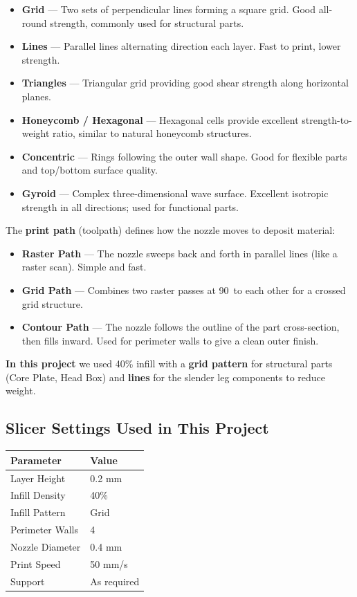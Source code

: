 \documentclass[12pt, a4paper]{article}
\begin{document}
\begin{itemize}[itemsep=3pt]
  \item \textbf{Grid} --- Two sets of perpendicular lines forming a square
  grid. Good all-round strength, commonly used for structural parts.
  \item \textbf{Lines} --- Parallel lines alternating direction each layer.
  Fast to print, lower strength.
  \item \textbf{Triangles} --- Triangular grid providing good shear strength
  along horizontal planes.
  \item \textbf{Honeycomb / Hexagonal} --- Hexagonal cells provide excellent
  strength-to-weight ratio, similar to natural honeycomb structures.
  \item \textbf{Concentric} --- Rings following the outer wall shape. Good for
  flexible parts and top/bottom surface quality.
  \item \textbf{Gyroid} --- Complex three-dimensional wave surface. Excellent
  isotropic strength in all directions; used for functional parts.
\end{itemize}

The \textbf{print path} (toolpath) defines how the nozzle moves to deposit
material:
\begin{itemize}[itemsep=3pt]
  \item \textbf{Raster Path} --- The nozzle sweeps back and forth in parallel
  lines (like a raster scan). Simple and fast.
  \item \textbf{Grid Path} --- Combines two raster passes at 90\textdegree\ to
  each other for a crossed grid structure.
  \item \textbf{Contour Path} --- The nozzle follows the outline of the part
  cross-section, then fills inward. Used for perimeter walls to give a clean
  outer finish.
\end{itemize}

\textbf{In this project} we used 40\% infill with a \textbf{grid pattern} for
structural parts (Core Plate, Head Box) and \textbf{lines} for the slender leg
components to reduce weight.

\subsection{Slicer Settings Used in This Project}

\begin{center}
\begin{tabular}{|l|l|}
\hline
\textbf{Parameter}  & \textbf{Value} \\
\hline
Layer Height        & 0.2 mm \\
Infill Density      & 40\%   \\
Infill Pattern      & Grid   \\
Perimeter Walls     & 4      \\
Nozzle Diameter     & 0.4 mm \\
Print Speed         & 50 mm/s \\
Support             & As required \\
\hline
\end{tabular}
\end{center}
\end{document}
